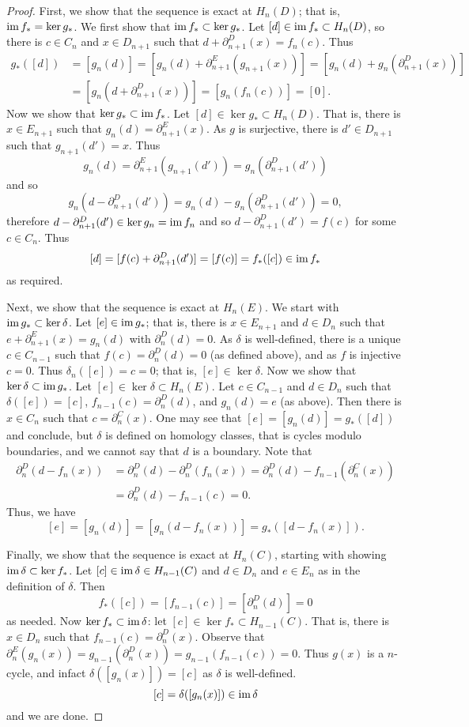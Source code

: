 \begin{proof}
	First, we show that the sequence is exact at $H_n(D)$; that is, $\operatorname{im} f_* = \ker g_*$. We first show that $\operatorname{im} f_* \subset \ker g_*$. Let $[d] \in \operatorname{im} f_* \subset H_n(D)$, so there is $c \in C_n$ and $x \in D_{n+1}$ such that $d + \partial_{n+1}^D(x) = f_n(c)$. Thus
	\begin{align*}
		g_*([d]) & =[g_n(d)]=[g_n(d) + \partial_{n+1}^E(g_{n+1}(x))]=[g_n(d)+g_n(\partial_{n+1}^D(x))] \\
		         & =[g_n(d+\partial_{n+1}^D(x))]=[g_n(f_n(c))]=[0].
	\end{align*}
	Now we show that $\ker g_* \subset \operatorname{im} f_*$. Let $[d] \in \ker g_* \subset H_n(D)$. That is, there is $x \in E_{n+1}$ such that $g_n(d) = \partial_{n+1}^E(x)$. As $g$ is surjective, there is $d' \in D_{n+1}$ such that $g_{n+1}(d') = x$. Thus
	\[g_n(d)=\partial_{n+1}^E(g_{n+1}(d'))=g_n(\partial_{n+1}^D(d'))\]
	and so
	\[g_n(d - \partial_{n+1}^D(d'))=g_n(d)-g_n(\partial_{n+1}^D(d'))=0,\]
	therefore $d - \partial_{n+1}^D(d') \in \ker g_n = \operatorname{im} f_n$ and so $d - \partial_{n+1}^D(d') = f(c)$ for some $c \in C_n$. Thus
	\[[d]=[f(c)+\partial_{n+1}^D(d')]=[f(c)]=f_*([c])\in\operatorname{im} f_*\]
	as required.

	Next, we show that the sequence is exact at $H_n(E)$. We start with $\operatorname{im} g_* \subset \ker \delta$. Let $[e] \in \operatorname{im} g_*$; that is, there is $x \in E_{n+1}$ and $d \in D_n$ such that $e + \partial_{n+1}^E(x) = g_n(d)$ with $\partial_n^D(d) = 0$. As $\delta$ is well-defined, there is a unique $c \in C_{n-1}$ such that $f(c) = \partial_n^D(d) = 0$ (as defined above), and as $f$ is injective $c = 0$. Thus $\delta_n([e]) = c = 0$; that is, $[e] \in \ker\delta$. Now we show that $\ker\delta \subset \operatorname{im} g_*$. Let $[e] \in \ker\delta \subset H_n(E)$. Let $c \in C_{n-1}$ and $d \in D_{n}$ such that $\delta([e]) = [c]$, $f_{n-1}(c)=\partial_{n}^D(d)$, and $g_n(d) = e$ (as above). Then there is $x \in C_n$ such that $c = \partial_n^C(x)$. One may see that $[e] = [g_n(d)]=g_*([d])$ and conclude, but $\delta$ is defined on homology classes, that is cycles modulo boundaries, and we cannot say that $d$ is a boundary. Note that
	\begin{align*}
		\partial_n^D(d - f_n(x)) & = \partial_n^D(d) - \partial_n^D(f_n(x)) = \partial_n^D(d) - f_{n-1}(\partial_n^C(x)) \\
		                         & =\partial_n^D(d)-f_{n-1}(c)=0.
	\end{align*}
	Thus, we have
	\[[e] = [g_n(d)] = [g_n(d-f_n(x))]=g_*([d-f_n(x)]).\]

	Finally, we show that the sequence is exact at $H_n(C)$, starting with showing $\operatorname{im}\delta \subset \ker f_*$. Let $[c] \in \operatorname{im}\delta \in H_{n-1}(C)$ and $d \in D_n$ and $e \in E_n$ as in the definition of $\delta$. Then
	\[ f_*([c])=[f_{n-1}(c)]=[\partial_n^D(d)]=0 \]
	as needed. Now $\ker f_* \subset \operatorname{im}\delta$: let $[c] \in \ker f_* \subset H_{n-1}(C)$. That is, there is $x \in D_n$ such that $f_{n-1}(c)=\partial_n^D(x)$. Observe that $\partial_n^E(g_n(x))=g_{n-1}(\partial_n^D(x)) = g_{n-1}(f_{n-1}(c)) = 0$. Thus $g(x)$ is a $n$-cycle, and infact $\delta([g_n(x)])=[c]$ as $\delta$ is well-defined.
	\[[c]=\delta([g_n(x)])\in\operatorname{im}\delta\]
	and we are done.
\end{proof}

